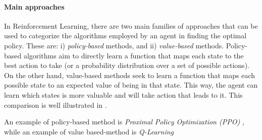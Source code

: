 \documentclass[12pt,a4paper,openright,twoside]{book}
\begin{document}
\paragraph{Main approaches}

In Reinforcement Learning, there are two main families of approaches that can be used to categorize the 
    algorithms employed by an agent in finding the optimal policy. These are: 
    i) \emph{policy-based} methods, and 
    ii) \emph{value-based} methods.
    Policy-based algorithms aim to directly learn a function that maps each state to the best action to take 
    (or a probability distribution over a set of possible actions). On the other hand, value-based methods 
    seek to learn a function that maps each possible state to an expected value of being in that state. 
    This way, the agent can learn which states is more valuable and will take action that leads to it. 
    This comparison is well illustrated in .

An example of policy-based method is \emph{Proximal Policy Optimization (PPO)} \cite{ppo}, while an example of 
    value based-method is \emph{Q-Learning} \cite{QL}
\end{document}
